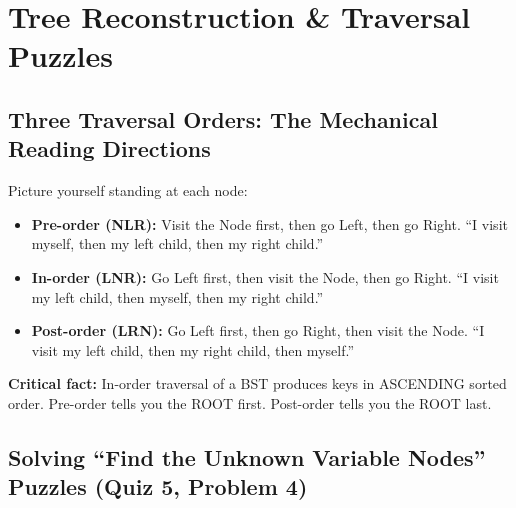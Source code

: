 \documentclass[12pt,portrait]{article}
\begin{document}
\section{Tree Reconstruction \& Traversal Puzzles}
\label{sec:tree_reconstruct}

\subsection{Three Traversal Orders: The Mechanical Reading Directions}

\begin{rulebox}
Picture yourself standing at each node:
\begin{itemize}[leftmargin=*]
    \item \textbf{Pre-order (NLR):} Visit the Node first, then go Left, then go Right. ``I visit myself, then my left child, then my right child.''
    \item \textbf{In-order (LNR):} Go Left first, then visit the Node, then go Right. ``I visit my left child, then myself, then my right child.''
    \item \textbf{Post-order (LRN):} Go Left first, then go Right, then visit the Node. ``I visit my left child, then my right child, then myself.''
\end{itemize}

\textbf{Critical fact:} In-order traversal of a BST produces keys in ASCENDING sorted order. Pre-order tells you the ROOT first. Post-order tells you the ROOT last.
\end{rulebox}

\subsection{Solving ``Find the Unknown Variable Nodes'' Puzzles (Quiz 5, Problem 4)}
\end{document}

